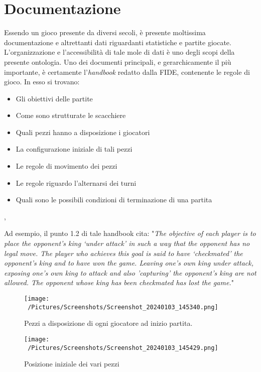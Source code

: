 \documentclass[12pt]{book}
\begin{document}
\chapter{Documentazione}

Essendo un gioco presente da diversi secoli, è presente moltissima
documentazione e altrettanti dati riguardanti statistiche e partite
giocate. L'organizzazione e l'accessibilità di tale mole di dati è uno degli scopi della
presente ontologia. Uno dei documenti principali, e gerarchicamente il
più importante, è certamente l'\textit{handbook} redatto dalla FIDE,
contenente le regole di gioco. In esso si trovano:
\begin{itemize}

  \item Gli obiettivi delle partite
  \item Come sono strutturate le scacchiere
  \item Quali pezzi hanno a disposizione i giocatori
  \item La configurazione iniziale di tali pezzi
  \item Le regole di movimento dei pezzi
  \item Le regole riguardo l'alternarsi dei turni
  \item Quali sono le possibili condizioni di terminazione di una
    partita

\end{itemize}, 


Ad esempio, il punto 1.2 di tale handbook cita: "\textit{The objective of each player is to place the opponent’s king ‘under attack’ in such a way
that the opponent has no legal move. The player who achieves this goal is said to have
‘checkmated’ the opponent’s king and to have won the game. Leaving one’s own king
under attack, exposing one’s own king to attack and also ’capturing’ the opponent’s king
are not allowed. The opponent whose king has been checkmated has lost
the game.}"

\begin{figure}[h]
  \caption{Pezzi a disposizione di ogni giocatore ad inizio partita.}
  \centering
  \label{fig:pezzi_inizio}
  \texttt{[image: ~/Pictures/Screenshots/Screenshot\_20240103\_145340.png]}
\end{figure} 

\begin{figure}[h]
  \caption{Posizione iniziale dei vari pezzi}
  \centering
  \label{fig:inizio_scacchiera}
  \texttt{[image: ~/Pictures/Screenshots/Screenshot\_20240103\_145429.png]}
\end{figure} 
\end{document}
